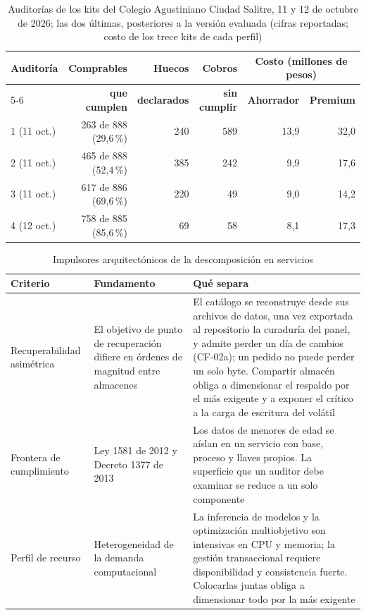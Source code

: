 \begin{table}[htbp]
\centering
\caption[Auditorías de los kits del Colegio Agustiniano Ciudad Salitre]{Auditorías de los kits del Colegio Agustiniano Ciudad Salitre, 11 y 12 de octubre de
2026; las dos últimas, posteriores a la versión evaluada (cifras reportadas; costo de los trece kits de cada perfil)}
\label{tab:kits}
\small
\begin{tabular}{@{}lrrrrr@{}}
\toprule
\textbf{Auditoría} & \textbf{Comprables} & \textbf{Huecos} & \textbf{Cobros} &
\multicolumn{2}{c}{\textbf{Costo (millones de pesos)}} \\
\cmidrule(l){5-6}
 & \textbf{que cumplen} & \textbf{declarados} & \textbf{sin cumplir} & \textbf{Ahorrador} &
\textbf{Premium} \\
\midrule
1 (11 oct.) & 263 de 888 (29,6\,\%) & 240 & 589 & 13,9 & 32,0 \\
2 (11 oct.) & 465 de 888 (52,4\,\%) & 385 & 242 & 9,9 & 17,6 \\
3 (11 oct.) & 617 de 886 (69,6\,\%) & 220 & 49 & 9,0 & 14,2 \\
4 (12 oct.) & 758 de 885 (85,6\,\%) & 69 & 58 & 8,1 & 17,3 \\
\bottomrule
\end{tabular}
\end{table}

\begin{table}[htbp]
\centering
\caption{Impulsores arquitectónicos de la descomposición en servicios}
\label{tab:impulsores}
\small
\begin{tabular}{@{}p{3.1cm}p{5.0cm}p{5.6cm}@{}}
\toprule
\textbf{Criterio} & \textbf{Fundamento} & \textbf{Qué separa} \\
\midrule
Recuperabilidad asimétrica &
El objetivo de punto de recuperación difiere en órdenes de magnitud entre almacenes &
El catálogo se reconstruye desde sus archivos de datos, una vez exportada al repositorio la
curaduría del panel, y admite perder un día de cambios (CF-02a); un pedido no puede perder un
solo byte. Compartir almacén obliga a dimensionar el
respaldo por el más exigente y a exponer el crítico a la carga de escritura del volátil \\
\addlinespace
Frontera de cumplimiento &
Ley 1581 de 2012 \citep{congreso_ley1581_2012} y Decreto 1377 de 2013
\citep{presidencia_decreto1377_2013} &
Los datos de menores de edad se aíslan en un servicio con base, proceso y llaves propios.
La superficie que un auditor debe examinar se reduce a un solo componente \\
\addlinespace
Perfil de recurso &
Heterogeneidad de la demanda computacional &
La inferencia de modelos y la optimización multiobjetivo son intensivas en CPU y memoria;
la gestión transaccional requiere disponibilidad y consistencia fuerte. Colocarlas juntas
obliga a dimensionar todo por la más exigente \\
\bottomrule
\end{tabular}
\end{table}

